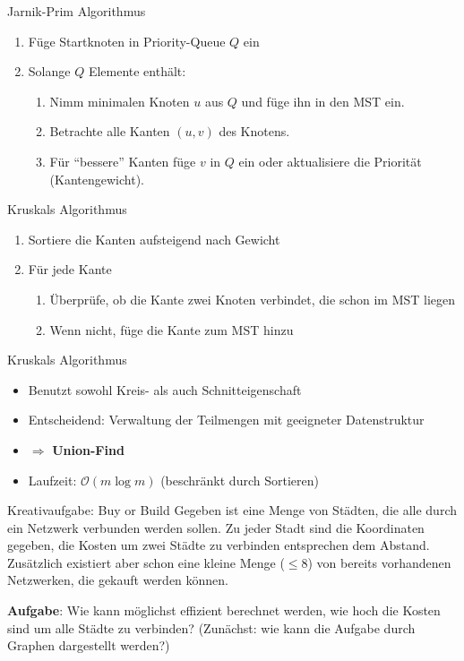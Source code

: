 \begin{frame}{Jarnik-Prim Algorithmus}
	\begin{enumerate}
		\item Füge Startknoten in Priority-Queue $Q$ ein
		\item Solange $Q$ Elemente enthält:
			\begin{enumerate}
				\item Nimm minimalen Knoten $u$ aus $Q$ und füge ihn in den MST ein.
				\item Betrachte alle Kanten $(u, v)$ des Knotens.
				\item Für "`bessere"' Kanten füge $v$ in $Q$ ein oder aktualisiere die Priorität (Kantengewicht).
			\end{enumerate}
	\end{enumerate}
\end{frame}

\begin{frame}{Kruskals Algorithmus}
	\begin{enumerate}
		\item Sortiere die Kanten aufsteigend nach Gewicht
		\item Für jede Kante
			\begin{enumerate}
				\item Überprüfe, ob die Kante zwei Knoten verbindet, die schon im MST liegen
				\item Wenn nicht, füge die Kante zum MST hinzu
			\end{enumerate}
	\end{enumerate}
\end{frame}

\begin{frame}{Kruskals Algorithmus}
	\begin{itemize}
		\item Benutzt sowohl Kreis- als auch Schnitteigenschaft
		\item Entscheidend: Verwaltung der Teilmengen mit geeigneter Datenstruktur
		\item $\Rightarrow$ \textbf{Union-Find}
		\item Laufzeit: $\mathcal{O}(m \log{m})$ (beschränkt durch Sortieren)
	\end{itemize}
\end{frame}

\begin{frame}{Kreativaufgabe: Buy or Build}
	Gegeben ist eine Menge von Städten, die alle durch ein Netzwerk verbunden werden sollen.
	Zu jeder Stadt sind die Koordinaten gegeben, die Kosten um zwei Städte zu verbinden entsprechen dem Abstand.
	Zusätzlich existiert aber schon eine kleine Menge ($\leq 8$) von bereits vorhandenen Netzwerken, die gekauft werden können.

	\textbf{Aufgabe}: Wie kann möglichst effizient berechnet werden, wie hoch die Kosten sind um alle Städte zu verbinden? (Zunächst: wie kann die Aufgabe durch Graphen dargestellt werden?)
\end{frame}


